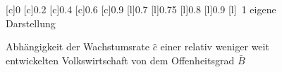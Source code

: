 \begin{figure}[htb] 
\vspace{0.23cm}
 \centering 
		[c]{\footnotesize{0}}
		[c]{\footnotesize{0.2}}
		[c]{\footnotesize{0.4}}
		[c]{\footnotesize{0.6}}
		[c]{\footnotesize{0.9}}
		[l]{\footnotesize{0.7}}
		[l]{\footnotesize{0.75}}
		[l]{\footnotesize{0.8}}
		[l]{\footnotesize{0.9}}
		[l]{~\footnotesize{1}}
	\hfill{}  eigene Darstellung
	\caption{Abhängigkeit der Wachstumsrate $\hat{c}$ einer relativ weniger weit entwickelten Volkswirtschaft von dem Offenheitsgrad $\bar{B}$}
	\label{fig:cDachEL}
\end{figure}
%
